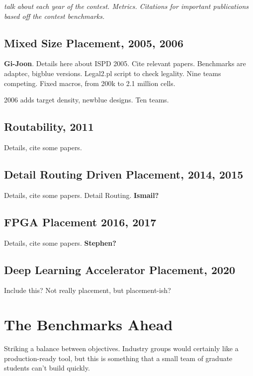 \documentclass[sigconf]{acmart}
\begin{document}
{\em talk about each year of the contest.  Metrics.  Citations
  for important publications based off the contest benchmarks.}

\subsection{Mixed Size Placement, 2005, 2006}

{\bf Gi-Joon}.  
Details here about ISPD 2005.  Cite relevant papers.
Benchmarks are adaptec, bigblue versions.  Legal2.pl script to
check legality.  Nine teams competing.
Fixed macros, from 200k to 2.1 million cells.

2006 adds target density, newblue designs.  Ten teams.  

\subsection{Routability, 2011}


Details, cite some papers.

\subsection{Detail Routing Driven Placement, 2014, 2015}

Details, cite some papers.
Detail Routing.
{\bf Ismail?}



\subsection{FPGA Placement 2016, 2017}

Details, cite some papers.
{\bf Stephen?}


\subsection{Deep Learning Accelerator Placement, 2020}

Include this?  Not really placement, but placement-ish?


\section{The Benchmarks Ahead}

Striking a balance between objectives.  Industry groups
would certainly like a production-ready tool, but this is
something that a small team of graduate students can't
build quickly.
\end{document}
